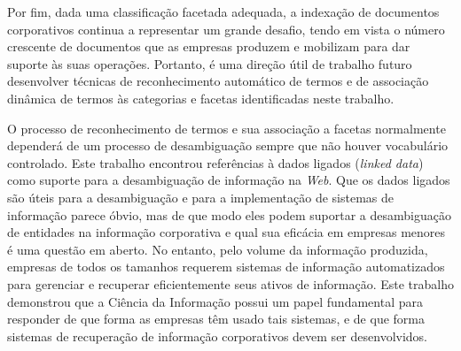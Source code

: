 
Por fim, dada uma classificação facetada adequada, a indexação de documentos corporativos continua a representar um grande desafio, tendo em vista o número crescente de documentos que as empresas produzem e mobilizam para dar suporte às suas operações. Portanto, é uma direção útil de trabalho futuro desenvolver técnicas de reconhecimento automático de termos e de associação dinâmica de termos às categorias e facetas identificadas neste trabalho.

O processo de reconhecimento de termos e sua associação a facetas normalmente dependerá de um processo de desambiguação sempre que não houver vocabulário controlado. Este trabalho encontrou referências à dados ligados (\textit{linked data}) como suporte para a desambiguação de informação na \textit{Web}. Que os dados ligados são úteis para a desambiguação e para a implementação de sistemas de informação parece óbvio, mas de que modo eles podem suportar a desambiguação de entidades na informação corporativa e qual sua eficácia em empresas menores é uma questão em aberto. No entanto, pelo volume da informação produzida, empresas de todos os tamanhos requerem sistemas de informação automatizados para gerenciar e recuperar eficientemente seus ativos de informação. Este trabalho demonstrou que a Ciência da Informação possui um papel fundamental para responder de que forma as empresas têm usado tais sistemas, e de que forma sistemas de recuperação de informação corporativos devem ser desenvolvidos.






